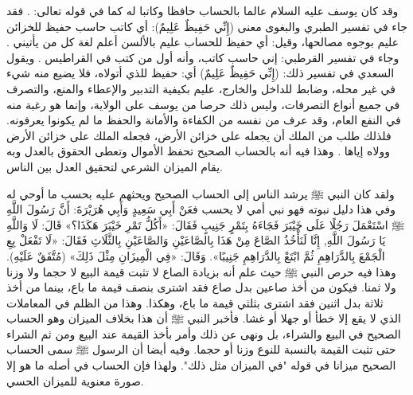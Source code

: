 وقد كان يوسف عليه السلام عالما بالحساب حافظا وكاتبا له كما في قوله تعالى: \quranayah*[12][55]{\footnotesize \surahname*[12]}. فقد جاء في تفسير الطبري والبغوى معنى (إِنِّي حَفِيظٌ عَلِيمٌ): أي كاتب حاسب حفيظ للخزائن عليم بوجوه مصالحها، وقيل: أي حفيظ للحساب عليم بالألسن أعلم لغة كل من يأتيني \cite{tafsir_Tabari}\cite{tafsir_Baghawi}. وجاء في تفسير القرطبي: إني حاسب كاتب، وأنه أول من كتب في القراطيس \cite{tafsir_Qurtubi}. ويقول السعدي في تفسير ذلك: (إِنِّي حَفِيظٌ عَلِيمٌ) أي: حفيظ للذي أتولاه، فلا يضيع منه شيء في غير محله، وضابط للداخل والخارج، عليم بكيفية التدبير والإعطاء والمنع، والتصرف في جميع أنواع التصرفات، وليس ذلك حرصا من يوسف على الولاية، وإنما هو رغبة منه في النفع العام، وقد عرف من نفسه من الكفاءة والأمانة والحفظ ما لم يكونوا يعرفونه. فلذلك طلب من الملك أن يجعله على خزائن الأرض، فجعله الملك على خزائن الأرض وولاه إياها \href{https://shamela.ws/book/42/841#p5}{\faExternalLink} \cite{tafsir_Saadi}. وهذا فيه أنه بالحساب الصحيح تحفظ الأموال وتعطى الحقوق بالعدل وبه يقام الميزان الشرعي لتحقيق العدل بين الناس.

ولقد كان النبي ﷺ يرشد الناس إلى الحساب الصحيح ويحثهم عليه بحسب ما أوحي له وفي هذا دليل نبوته فهو نبي أمي لا يحسب فعَنْ أَبِي سَعِيدٍ وَأَبِي هُرَيْرَةَ: أَنَّ رَسُولَ اللَّهِ ﷺ اسْتَعْمَلَ رَجُلًا عَلَى خَيْبَرَ فَجَاءَهُ بِتَمْرٍ جَنِيبٍ فَقَالَ: «أَكُلُّ تَمْرِ خَيْبَرَ هَكَذَا؟» قَالَ: لَا وَاللَّهِ يَا رَسُولَ اللَّهِ, إِنَّا لَنَأْخُذُ الصَّاعَ مِنْ هَذَا بِالصَّاعَيْنِ وَالصَّاعَيْنِ بِالثَّلَاثِ فَقَالَ: «لَا تَفْعَلْ بِعِ الْجَمْعَ بِالدَّرَاهِمِ ثُمَّ ابْتَعْ بِالدَّرَاهِمِ جَنِيبًا». وَقَالَ: «فِي الْمِيزَانِ مِثْلَ ذَلِكَ» {\footnotesize (مُتَّفَقٌ عَلَيْهِ)}.
وهذا فيه حرص النبي ﷺ حيث علم أنه بزيادة الصاع لا تثبت قيمة البيع لا حجما ولا وزنا ولا ثمنا. فيكون من أخذ صاعين بدل صاع فقد اشترى بنصف قيمة ما باع، بينما من أخذ ثلاثة بدل اثنين فقد اشترى بثلثي قيمة ما باع، وهكذا. وهذا من الظلم في المعاملات الذي لا يقع إلا خطأ أو جهلا أو غشا. فأخبر النبي ﷺ أن هذا بخلاف الميزان وهو الحساب الصحيح في البيع والشراء، بل ونهى عن ذلك وأمر بأخذ القيمة عند البيع ومن ثم الشراء حتى تثبت القيمة بالنسبة للنوع وزنا أو حجما. وفيه أيضا أن الرسول ﷺ سمى الحساب الصحيح ميزانا في قوله "في الميزان مثل ذلك". ولهذا فإن الحساب في أصله ما هو إلا صورة معنوية للميزان الحسي.

